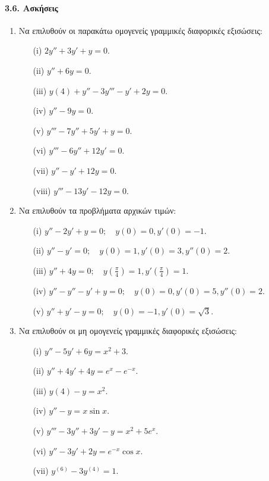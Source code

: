 \documentclass[11pt,a4paper,twoside]{book}
\begin{document}
\paragraph{3.6. Ασκήσεις}
\begin{enumerate}
    \item Να επιλυθούν οι παρακάτω ομογενείς γραμμικές διαφορικές εξισώσεις:
    \begin{enumerate}
        \item[(i)] $2y''+3y'+y=0$.
        \item[(ii)] $y''+6y=0$.
        \item[(iii)] $y(4)+y''-3y'''-y'+2y=0$.
        \item[(iv)] $y''-9y=0$.
        \item[(v)] $y'''-7y''+5y'+y=0$.
        \item[(vi)] $y'''-6y''+12y'=0$.
        \item[(vii)] $y''-y'+12y=0$.
        \item[(viii)] $y'''-13y'-12y=0$.
    \end{enumerate}
    \item Να επιλυθούν τα προβλήματα αρχικών τιμών:
    \begin{enumerate}
        \item[(i)] $y''-2y'+y=0; \quad y(0)=0, y'(0)=-1$.
        \item[(ii)] $y''-y'=0; \quad y(0)=1, y'(0)=3, y''(0)=2$.
        \item[(iii)] $y''+4y=0; \quad y(\frac{\pi}{4})=1, y'(\frac{\pi}{4})=1$.
        \item[(iv)] $y''-y''-y'+y=0; \quad y(0)=0, y'(0)=5, y''(0)=2$.
        \item[(v)] $y''+y'-y=0; \quad y(0)=-1, y'(0)=\sqrt{3}$.
    \end{enumerate}
    \item Να επιλυθούν οι μη ομογενείς γραμμικές διαφορικές εξισώσεις:
    \begin{enumerate}
        \item[(i)] $y''-5y'+6y=x^2+3$.
        \item[(ii)] $y''+4y'+4y=e^{x}-e^{-x}$.
        \item[(iii)] $y(4)-y=x^2$.
        \item[(iv)] $y''-y=x\sin x$.
        \item[(v)] $y'''-3y''+3y'-y=x^2+5e^x$.
        \item[(vi)] $y''-3y'+2y=e^{-x}\cos x$.
        \item[(vii)] $y^{(6)}-3y^{(4)}=1$.

\end{enumerate}
\end{enumerate}
\end{document}
